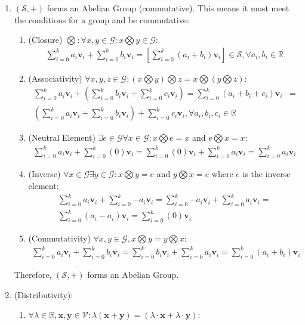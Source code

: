 \documentclass[a4paper,12pt]{book}
\newcommand{\set}[1]{\mathcal{#1}}
\newcommand{\operation}{\bigotimes}
\newcommand{\vectr}[1]{\textbf{#1}}
\newcommand{\real}{\mathbb{R}}
\newcommand{\lcomb}[1]{\sum_{i = 0}^{k} {#1} \vectr{v}_i}
\begin{document}
	\begin{enumerate}
		\item $ (\set{S}, +) $ forms an Abelian Group (commutative). This means it must meet the conditions for a group and be commutative:
		\begin{enumerate}
			\item (Closure)  $ \operation : \forall x,y \in \set{G} : x \operation y \in \set{G} $:
			\begin{align}
				\lcomb{a_i} + \lcomb{b_i} = \left[ \lcomb{(a_i + b_i)} \right] \in \set{S}, \forall a_i, b_i \in \real 
			\end{align}
			\item (Associativity) $ \forall x, y, z \in \set{G} : (x \operation y) \operation z = x \operation (y \operation z) $:
			\begin{align}
				\lcomb{a_i} + (\lcomb{b_i} + \lcomb{c_i}) = \lcomb{(a_i + b_i + c_i)} &=\\ (\lcomb{a_i} + \lcomb{b_i}) + \lcomb{c_i}, \forall a_i,b_i,c_i \in \real
			\end{align}
			\item (Neutral Element) $ \exists e  \in \set{G} \forall x \in \set{G} : x \operation e = x$ and $ e \operation x = x $:
			\begin{align}
				\lcomb{a_i} + \lcomb{(0)} = \lcomb{(0)} + \lcomb{a_i} = \lcomb{a_i}
			\end{align}
			\item (Inverse)  $ \forall x \in \set{G} \exists y \in \set{G} :  x \operation y = e$ and $ y \operation x = e $ where $ e $ is the inverse element: 
			\begin{align}
				\lcomb{a_i} + \lcomb{-a_i} = \lcomb{-a_i} + \lcomb{a_i} =\\ \lcomb{(a_i - a_i)} = \lcomb{(0)}
			\end{align}
			\item (Commutativity) $ \forall x, y \in \set{G}, x \operation y = y \operation x $:
			\begin{align}
				\lcomb{a_i} + \lcomb{b_i} = \lcomb{b_i} + \lcomb{a_i} = \lcomb{(a_i + b_i)}
			\end{align}
		\end{enumerate}
		Therefore, $ (\set{S}, +) $ forms an Abelian Group. 
		\item (Distributivity):
		\begin{enumerate}
			\item $\forall \lambda \in \real, \vectr{x}, \vectr{y} \in \mathcal{V}: \lambda (\vectr{x} + \vectr{y}) = (\lambda \cdot \vectr{x} + \lambda \cdot \vectr{y})$:

\end{enumerate}
\end{enumerate}
\end{document}
